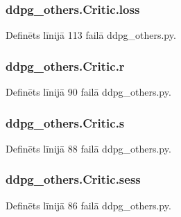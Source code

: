 \subsubsection[{\texorpdfstring{loss}{loss}}]{\setlength{\rightskip}{0pt plus 5cm}ddpg\+\_\+others.\+Critic.\+loss}\hypertarget{classddpg__others_1_1_critic_a234f0de11677fd4cc6b2387173ed5065}{}\label{classddpg__others_1_1_critic_a234f0de11677fd4cc6b2387173ed5065}


Definēts līnijā 113 failā ddpg\+\_\+others.\+py.

\subsubsection[{\texorpdfstring{r}{r}}]{\setlength{\rightskip}{0pt plus 5cm}ddpg\+\_\+others.\+Critic.\+r}\hypertarget{classddpg__others_1_1_critic_a127f5c9ec25bd223417b5f478bc2a11f}{}\label{classddpg__others_1_1_critic_a127f5c9ec25bd223417b5f478bc2a11f}


Definēts līnijā 90 failā ddpg\+\_\+others.\+py.

\subsubsection[{\texorpdfstring{s}{s}}]{\setlength{\rightskip}{0pt plus 5cm}ddpg\+\_\+others.\+Critic.\+s}\hypertarget{classddpg__others_1_1_critic_a6d70d80341ad76c8c12ddaf0e06e513a}{}\label{classddpg__others_1_1_critic_a6d70d80341ad76c8c12ddaf0e06e513a}


Definēts līnijā 88 failā ddpg\+\_\+others.\+py.

\subsubsection[{\texorpdfstring{sess}{sess}}]{\setlength{\rightskip}{0pt plus 5cm}ddpg\+\_\+others.\+Critic.\+sess}\hypertarget{classddpg__others_1_1_critic_ab0c8a33f283df68173a93990084034de}{}\label{classddpg__others_1_1_critic_ab0c8a33f283df68173a93990084034de}


Definēts līnijā 86 failā ddpg\+\_\+others.\+py.

